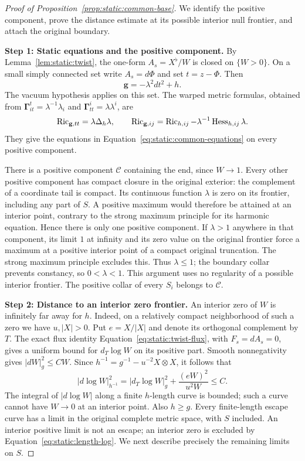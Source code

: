 \begin{proof}[Proof of Proposition~\ref{prop:static:common-base}]
We identify the positive component, prove the distance estimate at
its possible interior null frontier, and attach the original boundary.

\smallskip\noindent
\textbf{Step 1: Static equations and the positive component.}
By Lemma~\ref{lem:static:twist}, the one-form
$A_s=X^\flat/W$ is closed on $\{W>0\}$.  On a small simply
connected set write $A_s=d\Phi$ and set $t=z-\Phi$.  Then
\[
 \mathbf g=-\lambda^2dt^2+h.
\]
The vacuum hypothesis applies on this set.  The warped metric
formulas, obtained from
$\mathbf\Gamma^t_{it}=\lambda^{-1}\lambda_i$ and
$\mathbf\Gamma^i_{tt}=\lambda\lambda^i$, are
\[
 \operatorname{Ric}_{\mathbf g,tt}=\lambda\Delta_h\lambda,
 \qquad
 \operatorname{Ric}_{\mathbf g,ij}=\operatorname{Ric}_{h,ij}-\lambda^{-1}\operatorname{Hess}_{h,ij}\lambda.
\]
They give the equations in
Equation~\eqref{eq:static:common-equations} on every positive
component.

There is a positive component $\mathcal C$ containing the end,
since $W\to1$.  Every other positive component has compact
closure in the original exterior: the complement of a coordinate
tail is compact.  Its continuous function $\lambda$ is zero on
its frontier, including any part of $S$.  A positive maximum would
therefore be attained at an interior point, contrary to the strong
maximum principle for its harmonic equation.  Hence there is only
one positive component.  If $\lambda>1$ anywhere in that
component, its limit $1$ at infinity and its zero value on the
original frontier force a maximum at a positive interior point
of a compact original truncation.  The strong maximum principle
excludes this.  Thus $\lambda\leq1$; the boundary collar
prevents constancy, so $0<\lambda<1$.  This argument uses no
regularity of a possible interior frontier.
The positive collar of every $S_i$ belongs to $\mathcal C$.

\smallskip\noindent
\textbf{Step 2: Distance to an interior zero frontier.}
An interior zero of $W$ is infinitely far away for $h$.  Indeed,
on a relatively compact neighborhood of such a zero we have
$u,|X|>0$.  Put $e=X/|X|$ and denote its orthogonal complement
by $T$.  The exact flux identity
Equation~\eqref{eq:static:twist-flux}, with $F_s=dA_s=0$, gives a
uniform bound for $d_T\log W$ on its positive part.  Smooth
nonnegativity gives $|dW|_g^2\leq C W$.  Since
$h^{-1}=g^{-1}-u^{-2}X\otimes X$, it follows that
\begin{equation}\label{eq:static:length-log}
 |d\log W|_{h^{-1}}^2
 =|d_T\log W|_g^2+\frac{(eW)^2}{u^2W}\leq C.
\end{equation}
The integral of $|d\log W|$ along a finite $h$-length curve is
bounded; such a curve cannot have $W\to0$ at an interior point.
Also $h\geq g$.  Every finite-length escape curve has a limit in
the original complete metric space, with $S$ included.  An
interior positive limit is not an escape; an interior zero is
excluded by Equation~\eqref{eq:static:length-log}.  We next
describe precisely the remaining limits on $S$.


\end{proof}
